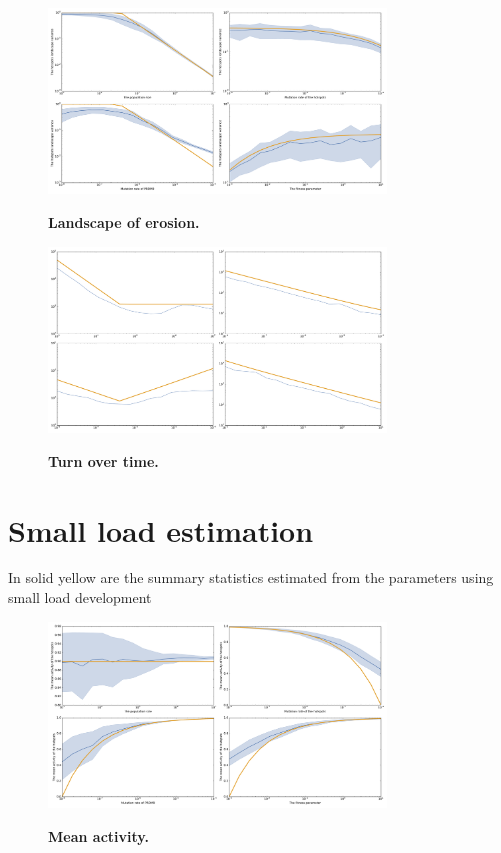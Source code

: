 \documentclass{article}
\begin{document}
\begin{figure}[!ht]
	  \centering
       \includegraphics[width=0.8\textwidth]{Images/mean-field-landscape-variance.pdf}\\
		\caption{ \textbf{ Landscape of erosion.} 
}
\end{figure}

\begin{figure}[!ht]
	  \centering
       \includegraphics[width=0.8\textwidth]{Images/mean-field-turn-over.pdf}\\
		\caption{ \textbf{ Turn over time.} 
}
\end{figure}

\clearpage

\section*{Small load estimation}
In solid yellow are the summary statistics estimated  from the parameters using small load development

\begin{figure}[!ht]
	  \centering
       \includegraphics[width=0.8\textwidth]{Images/small-load-mean-activity.pdf}\\
		\caption{ \textbf{ Mean activity.} 
}
\end{figure}
\end{document}
